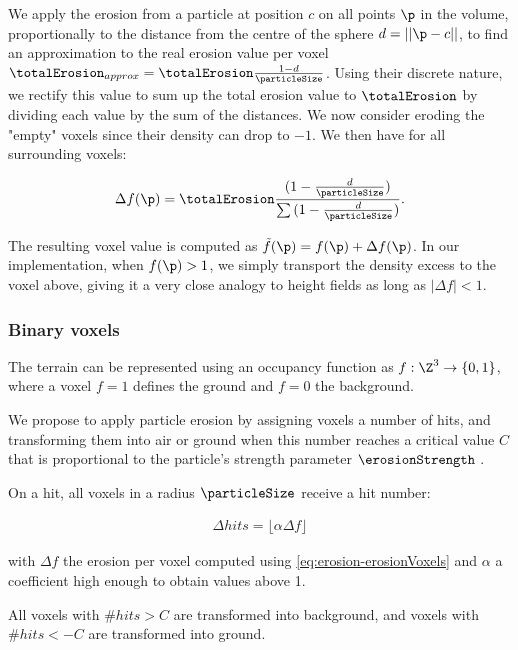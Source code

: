 We apply the erosion from a particle at position $c$ on all points $\p$ in the volume, proportionally to the distance from the centre of the sphere $d = ||\p - c||$, to find an approximation to the real erosion value per voxel $\totalErosion_{approx} = \totalErosion \frac{1 - d}{\particleSize}$.  
Using their discrete nature, we rectify this value to sum up the total erosion value to $\totalErosion$ by dividing each value by the sum of the distances. We now consider eroding the "empty" voxels since their density can drop to $-1$. We then have for all surrounding voxels: 

\begin{align}
    \label{eq:erosion-erosionVoxels}
    \Delta f(\p) = \totalErosion \frac{ (1 - \frac{d}{\particleSize} )}{ \sum {(1 - \frac{d}{\particleSize})}}.
\end{align}

The resulting voxel value is computed as $\Tilde{f}(\p) = f(\p) + \Delta f(\p)$.  
In our implementation, when $f(\p) > 1$, we simply transport the density excess to the voxel above, giving it a very close analogy to height fields as long as $|\Delta f| < 1$. 

\subsubsection{Binary voxels}
\label{sec:erosion-application_on_binary_voxels}

The terrain can be represented using an occupancy function as $f: \Z^3 \to \{0, 1\}$, where a voxel $f = 1$ defines the ground and $f = 0$ the background. 

We propose to apply particle erosion by assigning voxels a number of hits, and transforming them into air or ground when this number reaches a critical value $C$ that is proportional to the particle's strength parameter $\erosionStrength$ \cite{Jones2010}. 

On a hit, all voxels in a radius $\particleSize$ receive a hit number: 

\begin{align}
    \label{eq:erosion-erosionDiscreteVoxels}
    \Delta hits = \lfloor \alpha \Delta f \rfloor
\end{align}

with $\Delta f$ the erosion per voxel computed using \eqref{eq:erosion-erosionVoxels} and $\alpha$ a coefficient high enough to obtain values above 1. 

All voxels with $\# hits > C$ are transformed into background, and voxels with $\# hits < -C$ are transformed into ground.

